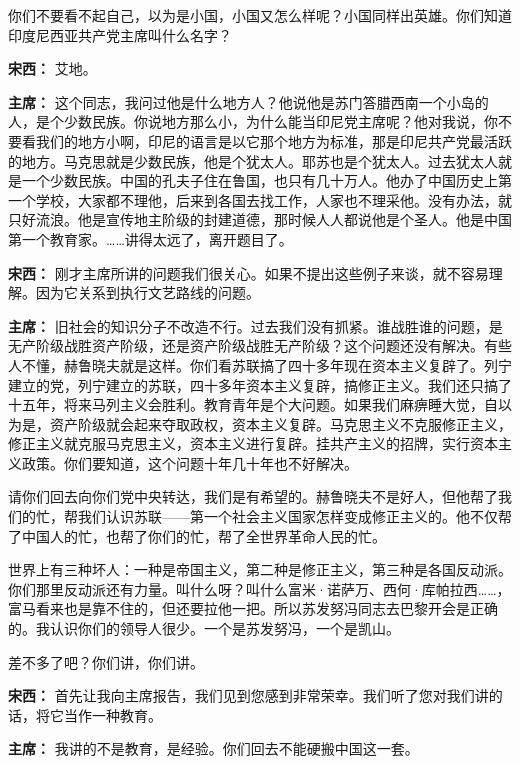 \begin{duihua}
你们不要看不起自己，以为是小国，小国又怎么样呢？小国同样出英雄。你们知道印度尼西亚共产党主席叫什么名字？

\item[\textbf{宋西：}] 艾地。

\item[\textbf{主席：}] 这个同志，我问过他是什么地方人？他说他是苏门答腊西南一个小岛的人，是个少数民族。你说地方那么小，为什么能当印尼党主席呢？他对我说，你不要看我们的地方小啊，印尼的语言是以它那个地方为标准，那是印尼共产党最活跃的地方。马克思就是少数民族，他是个犹太人。耶苏也是个犹太人。过去犹太人就是一个少数民族。中国的孔夫子住在鲁国，也只有几十万人。他办了中国历史上第一个学校，大家都不理他，后来到各国去找工作，人家也不理采他。没有办法，就只好流浪。他是宣传地主阶级的封建道德，那时候人人都说他是个圣人。他是中国第一个教育家。……讲得太远了，离开题目了。

\item[\textbf{宋西：}] 刚才主席所讲的问题我们很关心。如果不提出这些例子来谈，就不容易理解。因为它关系到执行文艺路线的问题。

\item[\textbf{主席：}] 旧社会的知识分子不改造不行。过去我们没有抓紧。谁战胜谁的问题，是无产阶级战胜资产阶级，还是资产阶级战胜无产阶级？这个问题还没有解决。有些人不懂，赫鲁晓夫就是这样。你们看苏联搞了四十多年现在资本主义复辟了。列宁建立的党，列宁建立的苏联，四十多年资本主义复辟，搞修正主义。我们还只搞了十五年，将来马列主义会胜利。教育青年是个大问题。如果我们麻痹睡大觉，自以为是，资产阶级就会起来夺取政权，资本主义复辟。马克思主义不克服修正主义，修正主义就克服马克思主义，资本主义进行复辟。挂共产主义的招牌，实行资本主义政策。你们要知道，这个问题十年几十年也不好解决。

请你们回去向你们党中央转达，我们是有希望的。赫鲁晓夫不是好人，但他帮了我们的忙，帮我们认识苏联——第一个社会主义国家怎样变成修正主义的。他不仅帮了中国人的忙，也帮了你们的忙，帮了全世界革命人民的忙。

世界上有三种坏人：一种是帝国主义，第二种是修正主义，第三种是各国反动派。你们那里反动派还有力量。叫什么呀？叫什么富米·诺萨万、西何·库帕拉西……，富马看来也是靠不住的，但还要拉他一把。所以苏发努冯同志去巴黎开会是正确的。我认识你们的领导人很少。一个是苏发努冯，一个是凯山。

差不多了吧？你们讲，你们讲。

\item[\textbf{宋西：}] 首先让我向主席报告，我们见到您感到非常荣幸。我们听了您对我们讲的话，将它当作一种教育。

\item[\textbf{主席：}] 我讲的不是教育，是经验。你们回去不能硬搬中国这一套。


\end{duihua}
